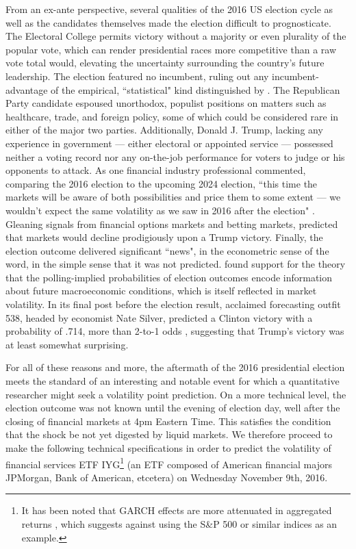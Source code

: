 \documentclass[11pt]{article}
\theoremstyle{definition}
\begin{document}
From an ex-ante perspective, several qualities of the 2016 US election cycle as well as the candidates themselves made the election difficult to prognosticate.  The Electoral College permits victory without a majority or even plurality of the popular vote, which can render presidential races more competitive than a raw vote total would, elevating the uncertainty surrounding the country's future leadership.  The election featured no incumbent, ruling out any incumbent-advantage of the empirical, ``statistical" kind distinguished by \citet{mayhew2008incumbency}.  The Republican Party candidate espoused unorthodox, populist positions on matters such as healthcare, trade, and foreign policy, some of which could be considered rare in either of the major two parties.  Additionally, Donald J. Trump, lacking any experience in government --- either electoral or appointed service --- possessed neither a voting record nor any on-the-job performance for voters to judge or his opponents to attack. As one financial industry professional commented, comparing the 2016 election to the upcoming 2024 election, ``this time the markets will be aware of both possibilities and price them to some extent — we wouldn’t expect the same volatility as we saw in 2016 after the election" \citep{Bloomberg.com_2024}. Gleaning signals from financial options markets and betting markets, \citet{wolfers2016financial} predicted that markets would decline prodigiously upon a Trump victory.  Finally, the election outcome delivered significant ``news", in the econometric sense of the word, in the simple sense that it was not predicted.  \citet{goodell2013us} found support for the theory that the polling-implied probabilities of election outcomes encode information about future macroeconomic conditions, which is itself reflected in market volatility.  In its final post before the election result, acclaimed forecasting outfit 538, headed by economist Nate Silver, predicted a Clinton victory with a probability of .714, more than 2-to-1 odds \citep{Silver_2016}, suggesting that Trump's victory was at least somewhat surprising.  

For all of these reasons and more, the aftermath of the 2016 presidential election meets the standard of an interesting and notable event for which a quantitative researcher might seek a volatility point prediction.  On a more technical level, the election outcome was not known until the evening of election day, well after the closing of financial markets at 4pm Eastern Time.  This satisfies the condition that the shock be not yet digested by liquid markets.  We therefore proceed to make the following technical specifications in order to predict the volatility of financial services ETF IYG\footnote{It has been noted that GARCH effects are more attenuated in aggregated returns \citep{zivot2009practical}, which suggests against using the S\&P 500 or similar indices as an example.} (an ETF composed of American financial majors JPMorgan, Bank of American, etcetera) on Wednesday November 9th, 2016.
\end{document}
